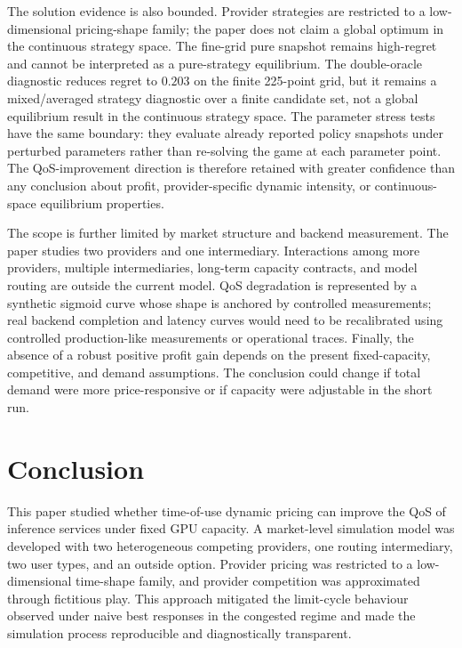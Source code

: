 \documentclass[11pt,a4paper]{article}
\begin{document}
The solution evidence is also bounded. Provider strategies are restricted to a low-dimensional pricing-shape family; the paper does not claim a global optimum in the continuous strategy space. The fine-grid pure snapshot remains high-regret and cannot be interpreted as a pure-strategy equilibrium. The double-oracle diagnostic reduces regret to $0.203$ on the finite 225-point grid, but it remains a mixed/averaged strategy diagnostic over a finite candidate set, not a global equilibrium result in the continuous strategy space. The parameter stress tests have the same boundary: they evaluate already reported policy snapshots under perturbed parameters rather than re-solving the game at each parameter point. The QoS-improvement direction is therefore retained with greater confidence than any conclusion about profit, provider-specific dynamic intensity, or continuous-space equilibrium properties.

The scope is further limited by market structure and backend measurement. The paper studies two providers and one intermediary. Interactions among more providers, multiple intermediaries, long-term capacity contracts, and model routing are outside the current model. QoS degradation is represented by a synthetic sigmoid curve whose shape is anchored by controlled measurements; real backend completion and latency curves would need to be recalibrated using controlled production-like measurements or operational traces. Finally, the absence of a robust positive profit gain depends on the present fixed-capacity, competitive, and demand assumptions. The conclusion could change if total demand were more price-responsive or if capacity were adjustable in the short run.

\section{Conclusion}
\label{sec:conclusion}

This paper studied whether time-of-use dynamic pricing can improve the QoS of inference services under fixed GPU capacity. A market-level simulation model was developed with two heterogeneous competing providers, one routing intermediary, two user types, and an outside option. Provider pricing was restricted to a low-dimensional time-shape family, and provider competition was approximated through fictitious play. This approach mitigated the limit-cycle behaviour observed under naive best responses in the congested regime and made the simulation process reproducible and diagnostically transparent.
\end{document}
